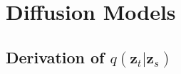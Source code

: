 \documentclass[ oneside,%
                    author={George Herbert},
                    degree={MSci},
                     title={Video Diffusion Models for Climate Simulations},
                  subtitle={}]{dissertation}
\begin{document}




\appendix

\chapter{Diffusion Models}
\label{appx:diffusion}

\section{Derivation of $q(\mathbf{z}_t|\mathbf{z}_s)$}
\label{appx:diffusion_q_z_t_given_z_s}
\end{document}

